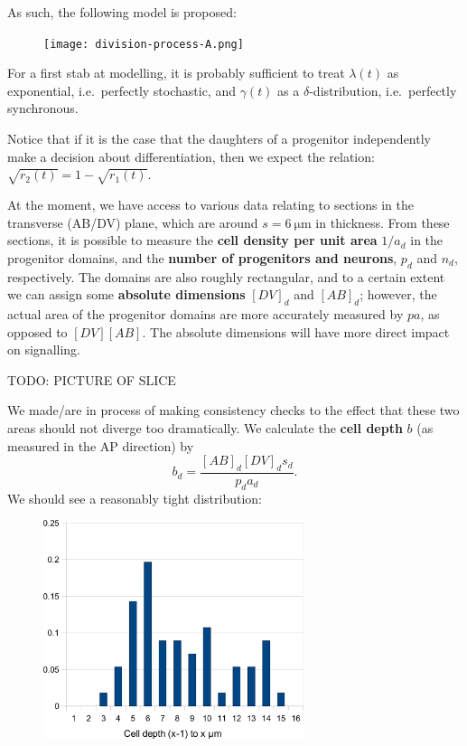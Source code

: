 \documentclass[10pt,english]{article}
\begin{document}
As such, the following model is proposed:

\begin{figure}[h]
	\begin{center}
		\texttt{[image: division-process-A.png]}
	\end{center}
\end{figure}

For a first stab at modelling, it is probably sufficient to treat $\lambda(t)$ as exponential, i.e.\ perfectly stochastic, and $\gamma(t)$ as a $\delta$-distribution, i.e.\ perfectly synchronous.

Notice that if it is the case that the daughters of a progenitor independently make a decision about differentiation, then we expect the relation: $\sqrt{r_2 (t)} = 1 - \sqrt{r_1(t)}$.

At the moment, we have access to various data relating to sections in the transverse (AB/DV) plane, which are around $s = \SI{6}{\micro\metre}$ in thickness. From these sections, it is possible to measure the \textbf{cell density per unit area} $1/a_d$ in the progenitor domains, and the \textbf{number of progenitors and neurons}, $p_d$ and $n_d$, respectively. The domains are also roughly rectangular, and to a certain extent we can assign some \textbf{absolute dimensions} $[DV]_d$ and $[AB]_d$; however, the actual area of the progenitor domains are more accurately measured by $p a$, as opposed to $[DV][AB]$. The absolute dimensions will have more direct impact on signalling.

TODO: PICTURE OF SLICE

We made/are in process of making consistency checks to the effect that these two areas should not diverge too dramatically. We calculate the \textbf{cell depth} $b$ (as measured in the AP direction) by $$b_d = \frac{[AB]_d[DV]_d s_d}{p_d a_d}.$$ We should see a reasonably tight distribution:

\begin{figure}[h]
	\begin{center}
		\includegraphics[width=3in]{consistency-cell-depth-distribution.png}
	\end{center}
\end{figure}
\end{document}
